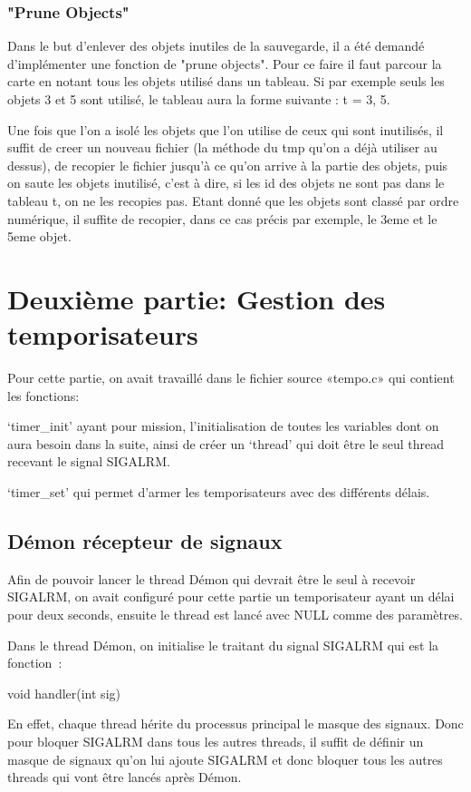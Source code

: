 \documentclass{article}
\begin{document}
\subsubsection{"Prune Objects"}
Dans le but d'enlever des objets inutiles de la sauvegarde, il a été demandé d'implémenter une fonction de "prune objects". Pour ce faire il faut parcour la carte en notant tous les objets utilisé dans un tableau. Si par exemple seuls les objets 3 et 5 sont utilisé, le tableau aura la forme suivante : t = {3, 5}.

Une fois que l'on a isolé les objets que l'on utilise de ceux qui sont inutilisés, il suffit de creer un nouveau fichier (la méthode du tmp qu'on a déjà utiliser au dessus), de recopier le fichier jusqu'à ce qu'on arrive à la partie des objets, puis on saute les objets inutilisé, c'est à dire, si les id des objets ne sont pas dans le tableau t, on ne les recopies pas. Etant donné que les objets sont classé par ordre numérique, il suffite de recopier, dans ce cas précis par exemple, le 3eme et le 5eme objet.


\newpage
\section{Deuxième partie: Gestion des temporisateurs}

Pour cette partie, on avait travaillé dans le fichier source «tempo.c» qui contient les fonctions: 

‘timer\_init’ ayant pour mission, l’initialisation de toutes les variables dont on aura besoin dans la suite, ainsi de créer un ‘thread’ qui doit être le seul thread recevant le signal SIGALRM. 

‘timer\_set’ qui permet d’armer les temporisateurs avec des différents délais.
\subsection{Démon récepteur de signaux}

Afin de pouvoir lancer le thread Démon qui devrait être le seul à recevoir SIGALRM, on avait configuré pour cette partie un temporisateur ayant un délai pour deux seconds, ensuite le thread est lancé avec NULL comme des paramètres.

Dans le thread Démon, on initialise le traitant du signal SIGALRM qui est la fonction :

void handler(int sig)

En effet, chaque thread hérite du processus principal le masque des signaux. Donc pour bloquer SIGALRM dans tous les autres threads, il suffit de définir un masque de signaux qu’on lui ajoute SIGALRM et donc bloquer tous les autres threads qui vont être lancés après Démon.
\end{document}
